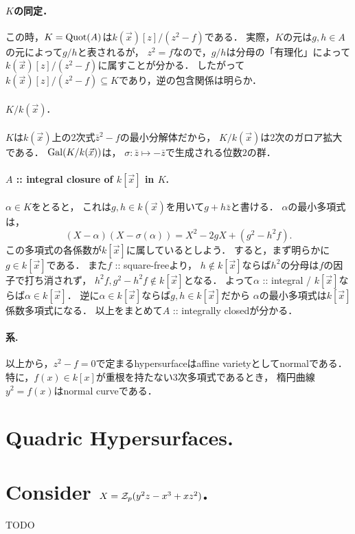 \documentclass[a4paper]{jsarticle}
\begin{document}
    \paragraph{$K$の同定．}
    この時，$K=\operatorname{Quot}(A)$は$k(\vec{x})[z]/(z^2-f)$である．
    実際，$K$の元は$g,h \in A$の元によって$g/h$と表されるが，
    $z^2=f$なので，$g/h$は分母の「有理化」によって$k(\vec{x})[z]/(z^2-f)$に属すことが分かる．
    したがって$k(\vec{x})[z]/(z^2-f) \subseteq K$であり，逆の包含関係は明らか．

    \paragraph{$K/k(\vec{x})$.}
    $K$は$k(\vec{x})$上の2次式$\bar{z}^2-f$の最小分解体だから，
    $K/k(\vec{x})$は2次のガロア拡大である．
    $\operatorname{Gal}(K/k(\vec{x}))$は，
    $\sigma: \bar{z} \mapsto -\bar{z}$で生成される位数$2$の群．

    \paragraph{$A$ :: integral closure of $k[\vec{x}]$ in $K$.}
    $\alpha \in K$をとると，
    これは$g,h \in k(\vec{x})$を用いて$g+h\bar{z}$と書ける．
    $\alpha$の最小多項式は，
    \[ (X-\alpha)(X-\sigma(\alpha))=X^2-2gX + (g^2 - h^2 f). \]
    この多項式の各係数が$k[\vec{x}]$に属しているとしよう．
    すると，まず明らかに$g \in k[\vec{x}]$である．
    また$f$ :: square-freeより，
    $h \not \in k[\vec{x}]$ならば$h^2$の分母は$f$の因子で打ち消されず，
    $h^2 f, g^2 - h^2 f\not \in k[\vec{x}]$となる．
    よって$\alpha$ :: integral / $k[\vec{x}]$ならば$\alpha \in k[\vec{x}]$．
    逆に$\alpha \in k[\vec{x}]$ならば$g,h \in k[\vec{x}]$だから
    $\alpha$の最小多項式は$k[\vec{x}]$係数多項式になる．
    以上をまとめて$A$ :: integrally closedが分かる．

    \paragraph{系.}
    以上から，$z^2-f=0$で定まるhypersurfaceはaffine varietyとしてnormalである．
    特に，$f(x) \in k[x]$が重根を持たない$3$次多項式であるとき，
    楕円曲線$y^2=f(x)$はnormal curveである．

\section{Quadric Hypersurfaces.} %

\section{Consider $X=\mathcal{Z}_p(y^2z-x^3+xz^2)$.} %
TODO
\end{document}
